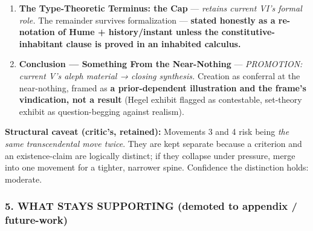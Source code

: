 \documentclass[11pt]{article}
\begin{document}
\begin{enumerate}
\item \textbf{The Type-Theoretic Terminus: the Cap} — \emph{retains current VI's formal role.} The remainder survives formalization — \textbf{stated honestly as a re-notation of Hume + history/\allowbreak{}instant unless the constitutive-inhabitant clause is proved in an inhabited calculus.}
\item \textbf{Conclusion — Something From the Near-Nothing} — \emph{PROMOTION: current V's aleph material → closing synthesis.} Creation as conferral at the near-nothing, framed as \textbf{a prior-dependent illustration and the frame's vindication, not a result} (Hegel exhibit flagged as contestable, set-theory exhibit as question-begging against realism).
\end{enumerate}

\textbf{Structural caveat (critic's, retained):} Movements 3 and 4 risk being \emph{the same transcendental move twice}. They are kept separate because a criterion and an existence-claim are logically distinct; if they collapse under pressure, merge into one movement for a tighter, narrower spine. Confidence the distinction holds: moderate.

\subsubsection*{5. WHAT STAYS SUPPORTING (demoted to appendix /\allowbreak{} future-work)}
\end{document}
